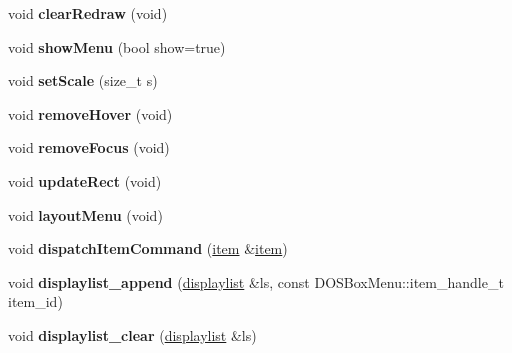 \begin{DoxyCompactItemize}
\item 
\hypertarget{classDOSBoxMenu_a523f4580806beef23c781a7a742cb4bb}{void {\bfseries clear\-Redraw} (void)}\label{classDOSBoxMenu_a523f4580806beef23c781a7a742cb4bb}

\item 
\hypertarget{classDOSBoxMenu_ae1de1dfa61396b4ea509e9aa04800b4a}{void {\bfseries show\-Menu} (bool show=true)}\label{classDOSBoxMenu_ae1de1dfa61396b4ea509e9aa04800b4a}

\item 
\hypertarget{classDOSBoxMenu_ab5b131b67cee55c8b890a78325daf2fa}{void {\bfseries set\-Scale} (size\-\_\-t s)}\label{classDOSBoxMenu_ab5b131b67cee55c8b890a78325daf2fa}

\item 
\hypertarget{classDOSBoxMenu_a9e750725f407191d3c338bc251561dfb}{void {\bfseries remove\-Hover} (void)}\label{classDOSBoxMenu_a9e750725f407191d3c338bc251561dfb}

\item 
\hypertarget{classDOSBoxMenu_afd583cf1dcf43e2e511731bc3d86c9ee}{void {\bfseries remove\-Focus} (void)}\label{classDOSBoxMenu_afd583cf1dcf43e2e511731bc3d86c9ee}

\item 
\hypertarget{classDOSBoxMenu_a00b1bc5e0078c90ca86b24685408a491}{void {\bfseries update\-Rect} (void)}\label{classDOSBoxMenu_a00b1bc5e0078c90ca86b24685408a491}

\item 
\hypertarget{classDOSBoxMenu_aa0b26378db7f976e6bb246764532919a}{void {\bfseries layout\-Menu} (void)}\label{classDOSBoxMenu_aa0b26378db7f976e6bb246764532919a}

\item 
\hypertarget{classDOSBoxMenu_a6356f4e032dc84dc83ddc4824daf2f06}{void {\bfseries dispatch\-Item\-Command} (\hyperlink{classDOSBoxMenu_1_1item}{item} \&\hyperlink{classDOSBoxMenu_1_1item}{item})}\label{classDOSBoxMenu_a6356f4e032dc84dc83ddc4824daf2f06}

\item 
\hypertarget{classDOSBoxMenu_a6c86bcaa64f95f78bec82414b1ff1035}{void {\bfseries displaylist\-\_\-append} (\hyperlink{classDOSBoxMenu_1_1displaylist}{displaylist} \&ls, const D\-O\-S\-Box\-Menu\-::item\-\_\-handle\-\_\-t item\-\_\-id)}\label{classDOSBoxMenu_a6c86bcaa64f95f78bec82414b1ff1035}

\item 
\hypertarget{classDOSBoxMenu_a8dc82bacd220ba27145c0475cc274a74}{void {\bfseries displaylist\-\_\-clear} (\hyperlink{classDOSBoxMenu_1_1displaylist}{displaylist} \&ls)}\label{classDOSBoxMenu_a8dc82bacd220ba27145c0475cc274a74}

\end{DoxyCompactItemize}
